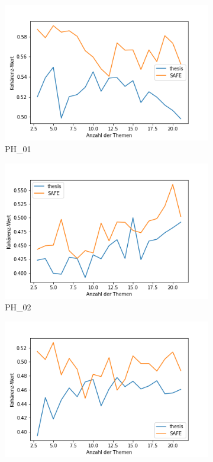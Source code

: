 \begin{figure}[!ht]
     \centering
     \begin{subfigure}[b]{0.495\textwidth}
         \centering
         \includegraphics[width=\textwidth]{media/cs_PH_A01.png}
         \caption{PH\_01}
         \label{fig:lda-a01}
     \end{subfigure}
     \hfill
     \begin{subfigure}[b]{0.495\textwidth}
         \centering
         \includegraphics[width=\textwidth]{media/cs_PH_A02.png}
         \caption{PH\_02}
         \label{fig:lda-a02}
     \end{subfigure}
     \hfill
     \begin{subfigure}[b]{0.495\textwidth}
         \centering
         \includegraphics[width=\textwidth]{media/cs_PH_A03.png}

\end{subfigure}
\end{figure}
